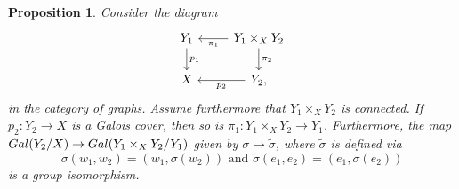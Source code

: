 \documentclass[11pt]{amsart}
\newtheorem{proposition}[theorem]{Proposition}
\numberwithin{equation}{section}
\theoremstyle{remark}
\begin{document}
\begin{proposition} \label{preserve_galois}
Consider the diagram
\begin{equation*}
\begin{tikzcd}
Y_{1} \arrow["p_{1}",d] &\arrow["\pi_{1}",l] \arrow["\pi_{2}",d] Y_{1} \times_{X}Y_{2}  \\
X & \arrow["p_{2}",l] Y_{2},
\end{tikzcd}
\end{equation*}
in the category of graphs.  Assume furthermore that $Y_{1}\times_{X}Y_{2}$ is connected.  If $p_{2}:Y_{2} \rightarrow X$ is a Galois cover, then so is $\pi_{1}:Y_{1}\times_{X}Y_{2} \rightarrow Y_{1}$.  Furthermore, the map ${\rm Gal}(Y_{2}/X) \rightarrow {\rm Gal}(Y_{1}\times_{X}Y_{2}/Y_{1})$ given by $\sigma \mapsto \tilde{\sigma}$, where $\tilde{\sigma}$ is defined via
$$\tilde{\sigma}(w_{1},w_{2}) = (w_{1},\sigma(w_{2})) \text{ and } \tilde{\sigma}(e_{1},e_{2}) = (e_{1},\sigma(e_{2})) $$
is a group isomorphism.
\end{proposition}
\end{document}
